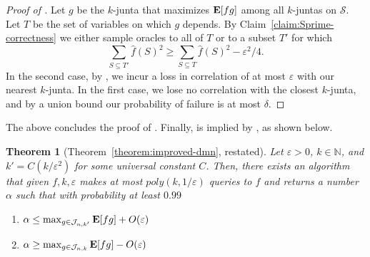 \documentclass[10pt,a4paper]{article}
\theoremstyle{plain}
\newtheorem{theorem}{Theorem}[section]
\theoremstyle{remark}
\theoremstyle{plain}
\newcommand{\N}{\mathbb{N}}
\providecommand{\E}{}
\renewcommand{\E}{\mathop{\bf E\/}}
\newcommand{\eps}{\varepsilon}
\renewcommand{\hat}{\widehat}
\newcommand{\calS}{\mathcal{S}}
\newcommand{\InfluentialCoords}{\calS}
\renewcommand{\epsilon}{\varepsilon}
\begin{document}
\begin{proof}[Proof of ]
Let $g$ be the $k$-junta that maximizes $\E[fg]$ among all $k$-juntas on $\InfluentialCoords$.
Let $T$ be the set of  variables on which $g$ depends.
By Claim~\ref{claim:Sprime-correctness} we either sample oracles to all of $T$ or to a subset $T'$ for which $$\sum_{S \subseteq T'} \hat{f}(S)^2 \geq \sum_{S \subseteq T} \hat{f}(S)^2 - \epsilon^2/4.$$
In the second case, by , we incur a loss in correlation of at most $\epsilon$ with our nearest $k$-junta. In the first case, we lose no correlation with the closest $k$-junta, and by a union bound our probability of failure is at most $\delta$.
\end{proof}
The above concludes the proof of . Finally,  is implied by , as shown below.


\begin{theorem}[Theorem~\ref{theorem:improved-dmn}, restated]
Let $\epsilon>0$, $k \in \N$, and $k' = C(k/\eps^2)$ for some universal constant $C$. Then, there exists an algorithm that given $f, k, \eps$ makes at most $poly(k, 1 / \eps)$ queries to $f$  and returns a number $\alpha$ such that with probability at least $0.99$
\begin{enumerate}
	\item $\alpha \le \max_{g \in \mathcal{J}_{n,k'}} \E[fg]+O(\epsilon)$
	\item $\alpha \ge \max_{g \in \mathcal{J}_{n,k}} \E[fg]-O(\epsilon)$
\end{enumerate}
\end{theorem}
\end{document}
